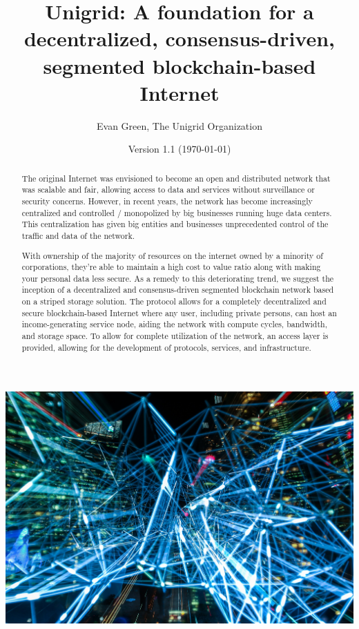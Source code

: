 \documentclass[12pt]{article}
\author{Evan Green, The Unigrid Organization}
\title{Unigrid: A foundation for a decentralized, consensus-driven, segmented blockchain-based Internet}
\date{Version 1.1 (\today)}
\begin{document}
\maketitle


\newpage
\thispagestyle{fancy}

\begin{abstract}
The original Internet was envisioned to become an open and distributed network that was scalable and fair, allowing access to data and services without surveillance or security concerns. However, in recent years, the network has become increasingly centralized and controlled / monopolized by big businesses running huge data centers. This centralization has given big entities and businesses unprecedented control of the traffic and data of the network.

With ownership of the majority of resources on the internet owned by a minority of corporations, they're able to maintain a high cost to value ratio along with making your personal data less secure. As a remedy to this deteriorating trend, we suggest the inception of a decentralized and consensus-driven segmented blockchain network based on a striped storage solution. The protocol allows for a completely decentralized and secure blockchain-based Internet where any user, including private persons, can host an income-generating service node, aiding the network with compute cycles, bandwidth, and storage space. To allow for complete utilization of the network, an access layer is provided, allowing for the development of protocols, services, and infrastructure.

\end{abstract}

\includegraphics[scale=0.12]{lights}
\end{document}

